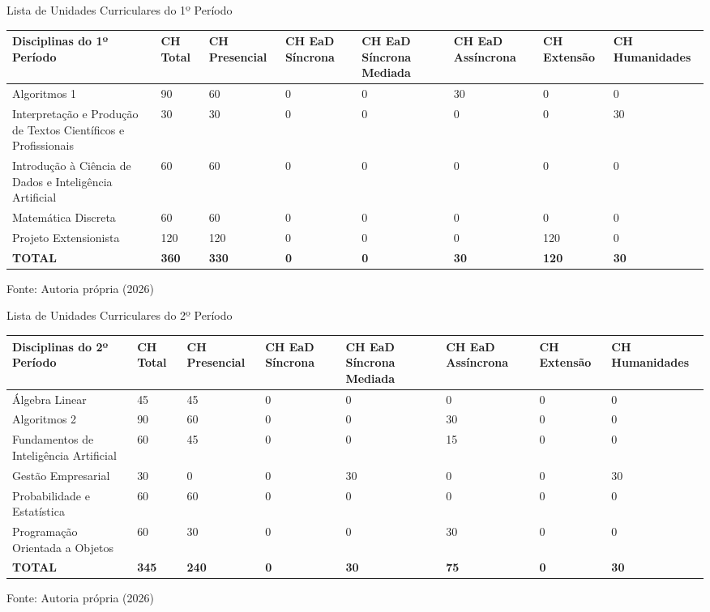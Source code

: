 \begin{quadro}[ht!]
\centering
\caption{Lista de Unidades Curriculares do 1º Período}
\label{quadro2.1}
\small

\begin{tabular}{|p{4.2cm}|p{1.2cm}|p{1.2cm}|p{1.2cm}|p{1.2cm}|p{1.2cm}|p{1.2cm}|p{1.2cm}|}
\hline
\rowcolor{gray!10} \textbf{Disciplinas do 1º Período} & \textbf{CH Total} & \textbf{CH Presencial} & \textbf{CH EaD Síncrona} & \textbf{CH EaD Síncrona Mediada} & \textbf{CH EaD Assíncrona} & \textbf{CH Extensão} & \textbf{CH Humanidades} \\ \hline
Algoritmos 1 & 90 & 60 & 0 & 0 & 30 & 0 & 0 \\ \hline
Interpretação e Produção de Textos Científicos e Profissionais & 30 & 30 & 0 & 0 & 0 & 0 & 30 \\ \hline
Introdução à Ciência de Dados e Inteligência Artificial & 60 & 60 & 0 & 0 & 0 & 0 & 0 \\ \hline
Matemática Discreta & 60 & 60 & 0 & 0 & 0 & 0 & 0 \\ \hline
Projeto Extensionista & 120 & 120 & 0 & 0 & 0 & 120 & 0 \\ \hline
\rowcolor{gray!20} \textbf{TOTAL} & \textbf{360} & \textbf{330} & \textbf{0} & \textbf{0} & \textbf{30} & \textbf{120} & \textbf{30} \\ \hline
\end{tabular}
\par\vspace{2pt}
\footnotesize{Fonte: Autoria própria (2026)}
\end{quadro}

\begin{quadro}[ht!]
\centering
\caption{Lista de Unidades Curriculares do 2º Período}
\label{quadro2.2}
\small
\begin{tabular}{|p{4.2cm}|p{1.2cm}|p{1.2cm}|p{1.2cm}|p{1.2cm}|p{1.2cm}|p{1.2cm}|p{1.2cm}|}
\hline
\rowcolor{gray!10} \textbf{Disciplinas do 2º Período} & \textbf{CH Total} & \textbf{CH Presencial} & \textbf{CH EaD Síncrona} & \textbf{CH EaD Síncrona Mediada} & \textbf{CH EaD Assíncrona} & \textbf{CH Extensão} & \textbf{CH Humanidades} \\ \hline
Álgebra Linear & 45 & 45 & 0 & 0 & 0 & 0 & 0 \\ \hline
Algoritmos 2 & 90 & 60 & 0 & 0 & 30 & 0 & 0 \\ \hline
Fundamentos de Inteligência Artificial & 60 & 45 & 0 & 0 & 15 & 0 & 0 \\ \hline
Gestão Empresarial & 30 & 0 & 0 & 30 & 0 & 0 & 30 \\ \hline
Probabilidade e Estatística & 60 & 60 & 0 & 0 & 0 & 0 & 0 \\ \hline
Programação Orientada a Objetos & 60 & 30 & 0 & 0 & 30 & 0 & 0 \\ \hline
\rowcolor{gray!20} \textbf{TOTAL} & \textbf{345} & \textbf{240} & \textbf{0} & \textbf{30} & \textbf{75} & \textbf{0} & \textbf{30} \\ \hline
\end{tabular}
\par\vspace{2pt}
\footnotesize{Fonte: Autoria própria (2026)}
\end{quadro}

